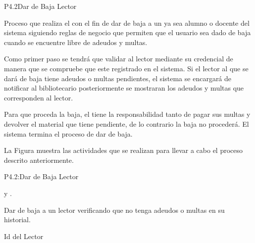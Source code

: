 
\begin{Proceso}{P4.2}{Dar de Baja Lector} {
  



  Proceso que realiza el  con el fin de dar de baja a un  ya sea alumno o docente del sistema siguiendo reglas de negocio que permiten que el usuario sea dado de baja cuando se encuentre libre de adeudos y multas.
  
Como primer paso se tendrá que validar al lector mediante su credencial de manera que se compruebe que este registrado en el sistema.
Si el lector al que se dará de baja tiene adeudos o multas pendientes, el sistema se encargará de notificar al bibliotecario posteriormente se mostraran los adeudos y multas que corresponden al lector.


  Para que proceda la baja, el  tiene la responsabilidad tanto de pagar sus multas y devolver el material que tiene pendiente, de lo contrario la baja no procederá.
El sistema termina el proceso de dar de baja. 


  \noindent La Figura  muestra las actividades que se realizan para llevar a cabo el proceso descrito anteriormente.


} {P4.2:Dar de Baja Lector}


   { %
     y .
  }

   { %
    Dar de baja a un lector verificando que no tenga adeudos o multas en su historial.
  }

   { %
  	\begin{UClist}
  		\UCli Id del Lector
    \end {UClist}
  }
  

\end{Proceso}
